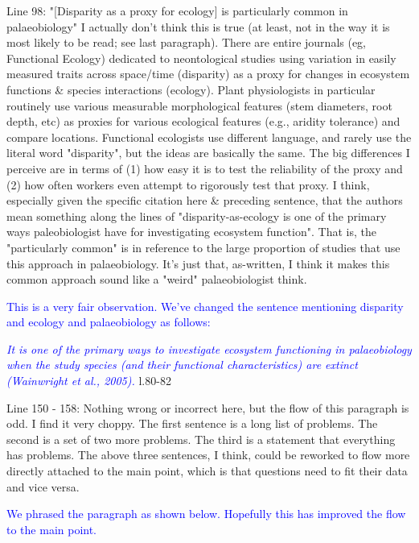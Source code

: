 \documentclass[12pt,letterpaper]{article}
\begin{document}
\noindent Line 98: "[Disparity as a proxy for ecology] is particularly common in palaeobiology" I actually don't think this is true (at least, not in the way it is most likely to be read; see last paragraph). There are entire journals (eg, Functional Ecology) dedicated to neontological studies using variation in easily measured traits across space/time (disparity) as a proxy for changes in ecosystem functions \& species interactions (ecology). Plant physiologists in particular routinely use various measurable morphological features (stem diameters, root depth, etc) as proxies for various ecological features (e.g., aridity tolerance) and compare locations. 
Functional ecologists use different language, and rarely use the literal word "disparity", but the ideas are basically the same. The big differences I perceive are in terms of (1) how easy it is to test the reliability of the proxy and (2) how often workers even attempt to rigorously test that proxy. 
I think, especially given the specific citation here \& preceding sentence, that the authors mean something along the lines of "disparity-as-ecology is one of the primary ways paleobiologist have for investigating ecosystem function". That is, the "particularly common" is in reference to the large proportion of studies that use this approach in palaeobiology. It's just that, as-written, I think it makes this common approach sound like a "weird" palaeobiologist think.

\textcolor{blue}{This is a very fair observation. We've changed the sentence mentioning disparity and ecology and palaeobiology as follows:}

\textcolor{blue}{\textit{It is one of the primary ways to investigate ecosystem functioning in palaeobiology when the study species (and their functional characteristics) are extinct (Wainwright et al., 2005).}} l.80-82 %

\noindent Line 150 - 158: Nothing wrong or incorrect here, but the flow of this paragraph is odd. I find it very choppy. The first sentence is a long list of problems. The second is a set of two more problems. The third is a statement that everything has problems. The above three sentences, I think, could be reworked to flow more directly attached to the main point, which is that questions need to fit their data and vice versa.

\textcolor{blue}{We phrased the paragraph as shown below. Hopefully this has improved the flow to the main point.}
\end{document}
